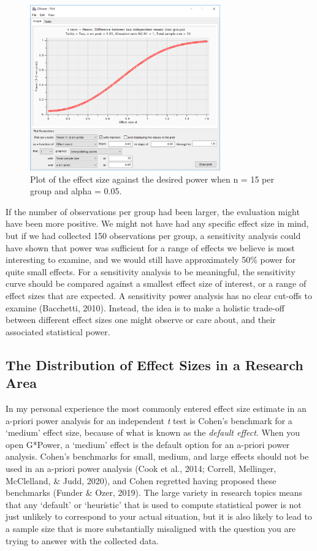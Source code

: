 \documentclass[
  english,
  ,jou, a4paper,floatsintext]{apa6}
\begin{document}
\begin{figure}
\includegraphics[width=3.23in]{images/sensitivity1} \caption{Plot of the effect size against the desired power when n = 15 per group and alpha = 0.05.}\label{fig:gsens1}
\end{figure}

If the number of observations per group had been larger, the evaluation might have been more positive. We might not have had any specific effect size in mind, but if we had collected 150 observations per group, a sensitivity analysis could have shown that power was sufficient for a range of effects we believe is most interesting to examine, and we would still have approximately 50\% power for quite small effects. For a sensitivity analysis to be meaningful, the sensitivity curve should be compared against a smallest effect size of interest, or a range of effect sizes that are expected. A sensitivity power analysis has no clear cut-offs to examine (Bacchetti, 2010). Instead, the idea is to make a holistic trade-off between different effect sizes one might observe or care about, and their associated statistical power.

\hypertarget{the-distribution-of-effect-sizes-in-a-research-area}{%
\subsection{The Distribution of Effect Sizes in a Research Area}\label{the-distribution-of-effect-sizes-in-a-research-area}}

In my personal experience the most commonly entered effect size estimate in an a-priori power analysis for an independent \emph{t} test is Cohen's benchmark for a `medium' effect size, because of what is known as the \emph{default effect}. When you open G*Power, a `medium' effect is the default option for an a-priori power analysis. Cohen's benchmarks for small, medium, and large effects should not be used in an a-priori power analysis (Cook et al., 2014; Correll, Mellinger, McClelland, \& Judd, 2020), and Cohen regretted having proposed these benchmarks (Funder \& Ozer, 2019). The large variety in research topics means that any `default' or `heuristic' that is used to compute statistical power is not just unlikely to correspond to your actual situation, but it is also likely to lead to a sample size that is more substantially misaligned with the question you are trying to answer with the collected data.
\end{document}
